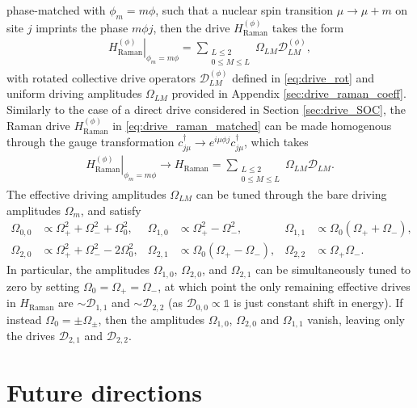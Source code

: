 \documentclass[nofootinbib,notitlepage,11pt]{revtex4-2}
\renewcommand{\t}{\text} %
\newcommand{\p}[1]{\left(#1\right)} %
\newcommand{\1}{\mathds{1}}
\newcommand{\D}{\mathcal{D}}
\begin{document}
phase-matched with $\phi_m=m\phi$, such that a nuclear spin transition
$\mu\to\mu+m$ on site $j$ imprints the phase $m\phi j$, then the drive
$H_{\t{Raman}}^{(\phi)}$ takes the form
\begin{align}
  \left. H_{\t{Raman}}^{(\phi)} \right|_{\phi_m=m\phi}
  = \sum_{\substack{L\le2\\0\le M\le L}} \Omega_{LM} \D_{LM}^{(\phi)},
  \label{eq:drive_raman_matched}
\end{align}
with rotated collective drive operators $\D_{LM}^{(\phi)}$ defined in
\eqref{eq:drive_rot} and uniform driving amplitudes $\Omega_{LM}$
provided in Appendix \ref{sec:drive_raman_coeff}.  Similarly to the
case of a direct drive considered in Section \ref{sec:drive_SOC}, the
Raman drive $H_{\t{Raman}}^{(\phi)}$ in \eqref{eq:drive_raman_matched}
can be made homogenous through the gauge transformation
$c_{j\mu}^\dag \to e^{i\mu\phi j} c_{j\mu}^\dag$, which takes
\begin{align}
  \left. H_{\t{Raman}}^{(\phi)} \right|_{\phi_m=m\phi}
  \to H_{\t{Raman}}
  = \sum_{\substack{L\le2\\0\le M\le L}} \Omega_{LM} \D_{LM}.
\end{align}
The effective driving amplitudes $\Omega_{LM}$ can be tuned through
the bare driving amplitudes $\Omega_m$, and satisfy
\begin{align}
  \Omega_{0,0} &\propto \Omega_+^2 + \Omega_-^2 + \Omega_0^2,
  &
  \Omega_{1,0} &\propto \Omega_+^2 - \Omega_-^2,
  &
  \Omega_{1,1} &\propto \Omega_0 \p{\Omega_+ + \Omega_-}, \\
  \Omega_{2,0} &\propto \Omega_+^2 + \Omega_-^2 - 2\Omega_0^2,
  &
  \Omega_{2,1} &\propto \Omega_0 \p{\Omega_+ - \Omega_-},
  &
  \Omega_{2,2} &\propto \Omega_+ \Omega_-.
\end{align}
In particular, the amplitudes $\Omega_{1,0}$, $\Omega_{2,0}$, and
$\Omega_{2,1}$ can be simultaneously tuned to zero by setting
$\Omega_0=\Omega_+=\Omega_-$, at which point the only remaining
effective drives in $H_{\t{Raman}}$ are $\sim\D_{1,1}$ and
$\sim\D_{2,2}$ (as $\D_{0,0}\propto\1$ is just constant shift in
energy).  If instead $\Omega_0=\pm\Omega_\pm$, then the amplitudes
$\Omega_{1,0}$, $\Omega_{2,0}$ and $\Omega_{1,1}$ vanish, leaving only
the drives $\D_{2,1}$ and $\D_{2,2}$.

\section{Future directions}
\end{document}
